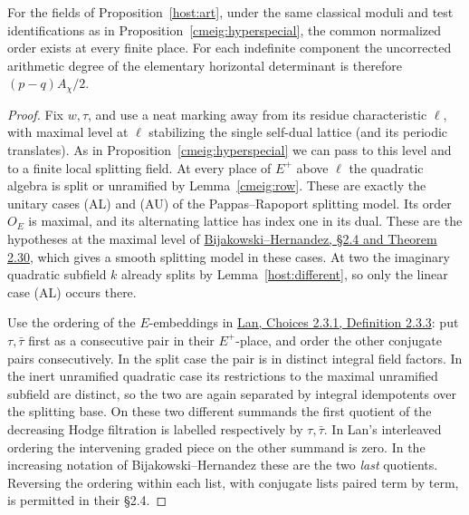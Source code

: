 \begin{theorem}
\label{cmeig:splitmodel}
For the fields of Proposition~\ref{host:art}, under the same
classical moduli and test identifications as in
Proposition~\ref{cmeig:hyperspecial}, the common normalized order
exists at every finite place. For each indefinite component the
uncorrected arithmetic degree of the elementary horizontal
determinant is therefore \((p-q)A_\chi/2\).
\end{theorem}
\begin{proof}
Fix \(w,\tau\), and use a neat marking away from its residue
characteristic \(\ell\), with maximal level at \(\ell\) stabilizing
the single self-dual lattice (and its periodic translates).
As in Proposition~\ref{cmeig:hyperspecial} we can pass to this
level and to a finite local splitting field. At every place of
\(E^+\) above \(\ell\) the quadratic algebra is split or
unramified by Lemma~\ref{cmeig:row}. These are exactly the
unitary cases (AL) and (AU) of the Pappas--Rapoport splitting
model. Its order \(O_E\) is maximal, and its alternating lattice
has index one in its dual. These are the hypotheses at the
maximal level of \href{https://stephane-bijakowski.perso.math.cnrs.fr/PRgeometry.pdf}
{Bijakowski--Hernandez, \S2.4 and Theorem 2.30}, which gives a
smooth splitting model in these cases. At two the imaginary
quadratic subfield \(k\) already splits by Lemma~\ref{host:different},
so only the linear case (AL) occurs there.

Use the ordering of the \(E\)-embeddings in
\href{https://www.kwlan.org/articles/cpt-spl.pdf}
{Lan, Choices 2.3.1, Definition 2.3.3}: put \(\tau,\bar\tau\)
first as a consecutive pair in their \(E^+\)-place, and order the
other conjugate pairs consecutively. In the split case the pair
is in distinct integral field factors. In the inert unramified
quadratic case its restrictions to the maximal unramified subfield
are distinct, so the two are again separated by integral
idempotents over the splitting base. On these two different
summands the first quotient of the decreasing Hodge filtration
is labelled respectively by \(\tau,\bar\tau\).
In Lan's interleaved ordering the intervening graded piece on
the other summand is zero. In the increasing notation of
Bijakowski--Hernandez these are the two \emph{last} quotients.
Reversing the ordering within each list, with conjugate lists
paired term by term, is permitted in their \S2.4.


\end{proof}
